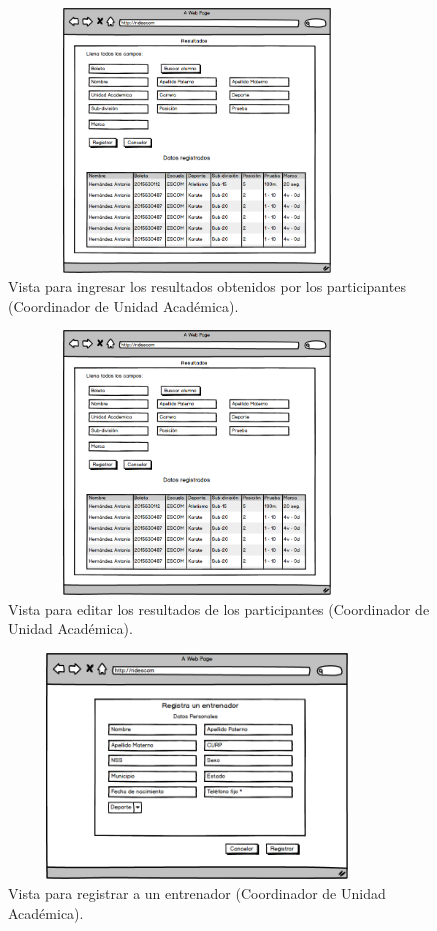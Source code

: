 		\begin{figure} [hbt!]
			\centering
			\includegraphics[width=10cm, height=7cm]{Imagenes/Nuevos/P10_Ingresa_resultados}
			\caption{Vista para ingresar los resultados obtenidos por los participantes (Coordinador de Unidad Académica).}
			\label{ingresaresultados}
		\end{figure}
		
		\begin{figure} [hbt!]
			\centering
			\includegraphics[width=10cm, height=7cm]{Imagenes/Nuevos/P11_Editar_resultados}
			\caption{Vista para editar los resultados de los participantes (Coordinador de Unidad Académica).}
			\label{editaresultados}
		\end{figure}
	\pagebreak
		
		\begin{figure} [hbt!]
			\centering
			\includegraphics[width=10cm, height=6cm]{Imagenes/Nuevos/P12_Registro_entrenador}
			\caption{Vista para registrar a un entrenador (Coordinador de Unidad Académica).}
			\label{registroentrenador}
		\end{figure}
		

